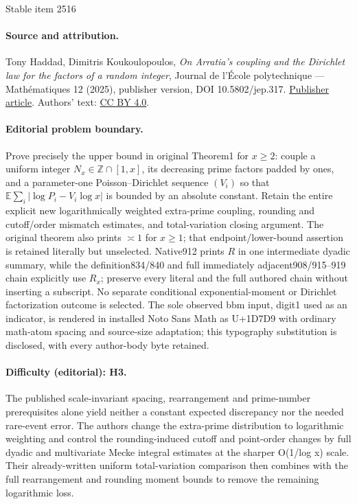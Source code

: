 \documentclass[11pt]{article}
\theoremstyle{plain}
\theoremstyle{definition}
\begin{document}
\begin{center}{\Large Stable item 2516}\end{center}
\paragraph{Source and attribution.}
Tony Haddad, Dimitris Koukoulopoulos, \emph{On Arratia’s coupling and the Dirichlet law for the factors of a random integer}, Journal de l’École polytechnique — Mathématiques 12 (2025), publisher version, DOI 10.5802/jep.317. \href{https://jep.centre-mersenne.org/articles/10.5802/jep.317/}{Publisher article}. Authors' text: \href{https://creativecommons.org/licenses/by/4.0/}{CC BY 4.0}.
\paragraph{Editorial problem boundary.}
Prove precisely the upper bound in original Theorem1 for $x\ge2$: couple a uniform integer $N_x\in\mathbb Z\cap[1,x]$, its decreasing prime factors padded by ones, and a parameter-one Poisson--Dirichlet sequence $(V_i)$ so that $\mathbb E\sum_i|\log P_i-V_i\log x|$ is bounded by an absolute constant. Retain the entire explicit new logarithmically weighted extra-prime coupling, rounding and cutoff/order mismatch estimates, and total-variation closing argument. The original theorem also prints $\asymp1$ for $x\ge1$; that endpoint/lower-bound assertion is retained literally but unselected. Native912 prints $R$ in one intermediate dyadic summary, while the definition834/840 and full immediately adjacent908/915--919 chain explicitly use $R_x$; preserve every literal and the full authored chain without inserting a subscript. No separate conditional exponential-moment or Dirichlet factorization outcome is selected. The sole observed bbm input, digit1 used as an indicator, is rendered in installed Noto Sans Math as U+1D7D9 with ordinary math-atom spacing and source-size adaptation; this typography substitution is disclosed, with every author-body byte retained.
\paragraph{Difficulty (editorial): H3.}
The published scale-invariant spacing, rearrangement and prime-number prerequisites alone yield neither a constant expected discrepancy nor the needed rare-event error. The authors change the extra-prime distribution to logarithmic weighting and control the rounding-induced cutoff and point-order changes by full dyadic and multivariate Mecke integral estimates at the sharper O(1/log x) scale. Their already-written uniform total-variation comparison then combines with the full rearrangement and rounding moment bounds to remove the remaining logarithmic loss.
\end{document}
